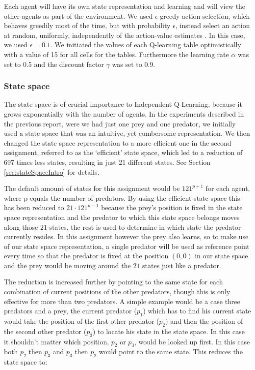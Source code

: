  Each agent will have its own state representation and learning and will view the other agents as part of the environment. We used $\epsilon$-greedy action selection, which behaves greedily most of the time, but with probability $\epsilon$, instead select an action at random, uniformly, independently of the action-value estimates \cite[pp. 28]{RL1}. In this case, we used $\epsilon = 0.1$. We initiated the values of each Q-learning table optimistically with a value of 15 for all cells for the tables. Furthermore the learning rate $\alpha$ was set to 0.5 and the discount factor $\gamma$ was set to 0.9.

\subsubsection{State space} \label{sec:stateSpaceIQL}
The state space is of crucial importance to Independent Q-Learning, because it grows exponentially with the number of agents. In the experiments described in the previous report, were we had just one prey and one predator, we initially used a state space that was an intuitive, yet cumbersome representation. We then changed the state space representation to a more efficient one in the second assignment, referred to as the `efficient' state space, which led to a reduction of 697 times less states, resulting in just 21 different states. See Section \ref{sec:stateSpaceIntro} for details.

The default amount of states for this assignment would be $121^{p+1}$ for each agent, where p equals the number of predators. By using the efficient state space this has been reduced to $21\cdot 121^{p-1}$ because the prey's position is fixed in the state space representation and the predator to which this state space belongs moves along those $21$ states, the rest is used to determine in which state the predator currently resides. In this assignment however the prey also learns, so to make use of our state space representation, a single predator will be used as reference point every time so that the predator is fixed at the position $(0, 0)$ in our state space and the prey would be moving around the $21$ states just like a predator. 

The reduction is increased further by pointing to the same state for each combination of current positions of the other predators, though this is only effective for more than two predators. A simple example would be a case three predators and a prey, the current predator ($p_1$) which has to find his current state would take the position of the first other predator ($p_2$) and then the position of the second other predator ($p_3$) to locate his state in the state space. In this case it shouldn't matter which position, $p_2$ or $p_3$, would be looked up first. In this case both $p_2$ then $p_3$ and $p_3$ then $p_2$ would point to the same state. This reduces the state space to:

